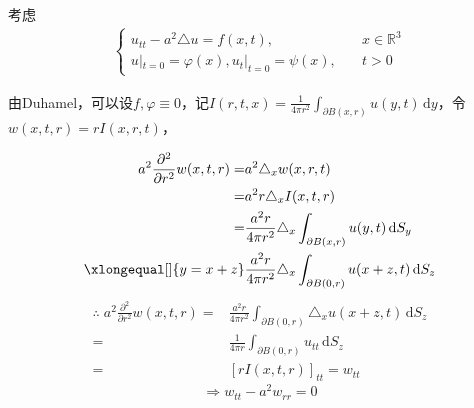 \documentclass[11pt, a4paper]{article}
\theoremstyle{theorem}
\newcommand{\intd}[1]{\,\mathrm{d}{#1}}
\begin{document}
考虑
\begin{align}
\begin{cases}
    u_{tt} - a^2 \triangle u = f(x,t), \quad \quad &x \in \mathbb{R}^3 \\
    u|_{t = 0} = \varphi(x), u_t|_{t = 0} = \psi(x), \quad &t > 0
\end{cases}
\end{align}

由Duhamel，可以设$f, \varphi \equiv 0$，记$I(r,t,x) = \frac{1}{4\pi r^2} \int_{\partial B(x,r)} u(y,t) \intd y$，令$w(x,t,r) = rI(x,r,t)$，

\begin{align*}
    a^2 \frac{\partial^2 }{\partial r^2} w(x,t,r) = &a^2 \triangle_x w(x,r,t) \\
    = &a^2 r \triangle_x I(x,t,r) \\
    = &\frac{a^2 r}{4\pi r^2} \triangle_x \int_{\partial B(x,r)} u(y,t) \intd S_y \\
    \xlongequal[]{y=x+z} &\frac{a^2 r}{4 \pi r^2} \triangle_x \int_{\partial B(0,r)} u(x+z, t) \intd S_z \\
\end{align*}
\begin{align*}
\therefore \;
    a^2 \frac{\partial^2 }{\partial r^2} w(x,t,r)= &\frac{a^2 r}{4 \pi r^2} \int_{\partial B(0,r)} \triangle_x u(x+z, t) \intd S_z \\
    = &\frac{1}{4 \pi r} \int_{\partial B(0,r)} u_{tt} \intd S_z \\
    = &\left[r I(x,t,r)\right]_{tt} = w_{tt}
\end{align*}
$$
\Rightarrow w_{tt} - a^2 w_{rr} = 0
$$
\end{document}
